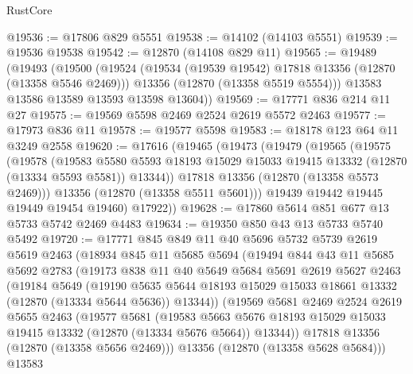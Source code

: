 \begin{lexlean}{RustCore}
\begin{coremodule}
@19536 := @17806 @829 @5551
@19538 := @14102 (@14103 @5551)
@19539 := @19536 @19538
@19542 := @12870 (@14108 @829 @11)
@19565 := @19489
    (@19493
      (@19500
        (@19524
          (@19534 (@19539 @19542) @17818 @13356 (@12870 (@13358 @5546 @2469)))
          @13356
          (@12870 (@13358 @5519 @5554)))
        @13583
        @13586
        @13589
        @13593
        @13598
        @13604))
@19569 := @17771 @836 @214 @11 @27
@19575 := @19569 @5598 @2469 @2524 @2619 @5572 @2463
@19577 := @17973 @836 @11
@19578 := @19577 @5598
@19583 := @18178 @123 @64 @11 @3249 @2558
@19620 := @17616
    (@19465
      (@19473
        (@19479
          (@19565
            (@19575
              (@19578
                (@19583
                  @5580
                  @5593
                  @18193
                  @15029
                  @15033
                  @19415
                  @13332
                  (@12870 (@13334 @5593 @5581))
                  @13344))
              @17818
              @13356
              (@12870 (@13358 @5573 @2469)))
            @13356
            (@12870 (@13358 @5511 @5601)))
          @19439
          @19442
          @19445
          @19449
          @19454
          @19460)
        @17922))
@19628 := @17860 @5614 @851 @677 @13 @5733 @5742 @2469 @4483
@19634 := @19350 @850 @43 @13 @5733 @5740 @5492
@19720 := @17771
    @845
    @849
    @11
    @40
    @5696
    @5732
    @5739
    @2619
    @5619
    @2463
    (@18934
      @845
      @11
      @5685
      @5694
      (@19494
        @844
        @43
        @11
        @5685
        @5692
        @2783
        (@19173
          @838
          @11
          @40
          @5649
          @5684
          @5691
          @2619
          @5627
          @2463
          (@19184
            @5649
            (@19190
              @5635
              @5644
              @18193
              @15029
              @15033
              @18661
              @13332
              (@12870 (@13334 @5644 @5636))
              @13344))
          (@19569
            @5681
            @2469
            @2524
            @2619
            @5655
            @2463
            (@19577
              @5681
              (@19583
                @5663
                @5676
                @18193
                @15029
                @15033
                @19415
                @13332
                (@12870 (@13334 @5676 @5664))
                @13344))
            @17818
            @13356
            (@12870 (@13358 @5656 @2469)))
          @13356
          (@12870 (@13358 @5628 @5684)))
        @13583

\end{coremodule}
\end{lexlean}
